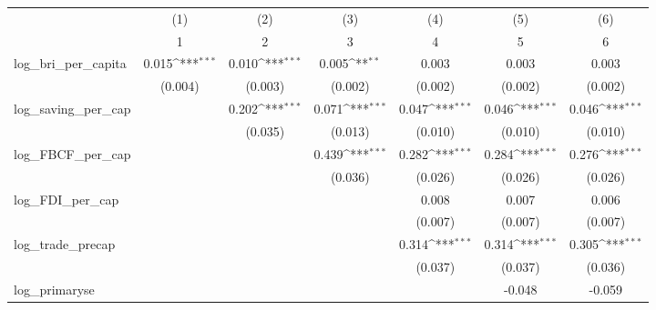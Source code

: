 {
\def\sym#1{\ifmmode^{#1}\else\(^{#1}\)\fi}
\begin{tabular}{l*{6}{c}}
\toprule
            &\multicolumn{1}{c}{(1)}&\multicolumn{1}{c}{(2)}&\multicolumn{1}{c}{(3)}&\multicolumn{1}{c}{(4)}&\multicolumn{1}{c}{(5)}&\multicolumn{1}{c}{(6)}\\
            &\multicolumn{1}{c}{1}&\multicolumn{1}{c}{2}&\multicolumn{1}{c}{3}&\multicolumn{1}{c}{4}&\multicolumn{1}{c}{5}&\multicolumn{1}{c}{6}\\
\midrule
log\_bri\_per\_capita&       0.015\sym{***}&       0.010\sym{***}&       0.005\sym{**} &       0.003         &       0.003         &       0.003         \\
            &     (0.004)         &     (0.003)         &     (0.002)         &     (0.002)         &     (0.002)         &     (0.002)         \\
\addlinespace
log\_saving\_per\_cap&                     &       0.202\sym{***}&       0.071\sym{***}&       0.047\sym{***}&       0.046\sym{***}&       0.046\sym{***}\\
            &                     &     (0.035)         &     (0.013)         &     (0.010)         &     (0.010)         &     (0.010)         \\
\addlinespace
log\_FBCF\_per\_cap&                     &                     &       0.439\sym{***}&       0.282\sym{***}&       0.284\sym{***}&       0.276\sym{***}\\
            &                     &                     &     (0.036)         &     (0.026)         &     (0.026)         &     (0.026)         \\
\addlinespace
log\_FDI\_per\_cap&                     &                     &                     &       0.008         &       0.007         &       0.006         \\
            &                     &                     &                     &     (0.007)         &     (0.007)         &     (0.007)         \\
\addlinespace
log\_trade\_precap&                     &                     &                     &       0.314\sym{***}&       0.314\sym{***}&       0.305\sym{***}\\
            &                     &                     &                     &     (0.037)         &     (0.037)         &     (0.036)         \\
\addlinespace
log\_primaryse&                     &                     &                     &                     &      -0.048         &      -0.059         \\

\end{tabular}}
